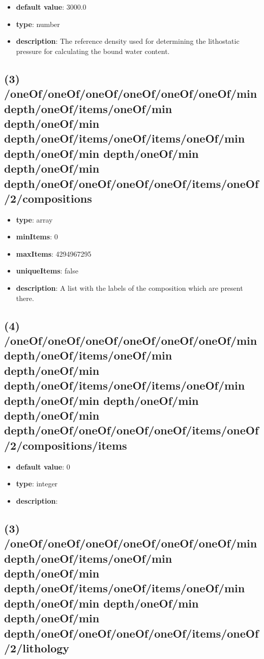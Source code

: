 \begin{itemize}[leftmargin=3em]\item {\bf default value}: 3000.0
\item {\bf type}: number
\item {\bf description}: The reference density used for determining the lithostatic pressure for calculating the bound water content.
\end{itemize}\subsection{(3) /oneOf/oneOf/oneOf/oneOf/oneOf/oneOf/min depth/oneOf/items/oneOf/min depth/oneOf/min depth/oneOf/items/oneOf/items/oneOf/min depth/oneOf/min depth/oneOf/min depth/oneOf/min depth/oneOf/oneOf/oneOf/oneOf/items/oneOf/2/compositions}
\begin{itemize}[leftmargin=3em]\item {\bf type}: array
\item {\bf minItems}: 0
\item {\bf maxItems}: 4294967295
\item {\bf uniqueItems}: false
\item {\bf description}: A list with the labels of the composition which are present there.
\end{itemize}\subsection{(4) /oneOf/oneOf/oneOf/oneOf/oneOf/oneOf/min depth/oneOf/items/oneOf/min depth/oneOf/min depth/oneOf/items/oneOf/items/oneOf/min depth/oneOf/min depth/oneOf/min depth/oneOf/min depth/oneOf/oneOf/oneOf/oneOf/items/oneOf/2/compositions/items}
\begin{itemize}[leftmargin=4em]\item {\bf default value}: 0
\item {\bf type}: integer
\item {\bf description}: 
\end{itemize}\subsection{(3) /oneOf/oneOf/oneOf/oneOf/oneOf/oneOf/min depth/oneOf/items/oneOf/min depth/oneOf/min depth/oneOf/items/oneOf/items/oneOf/min depth/oneOf/min depth/oneOf/min depth/oneOf/min depth/oneOf/oneOf/oneOf/oneOf/items/oneOf/2/lithology}
